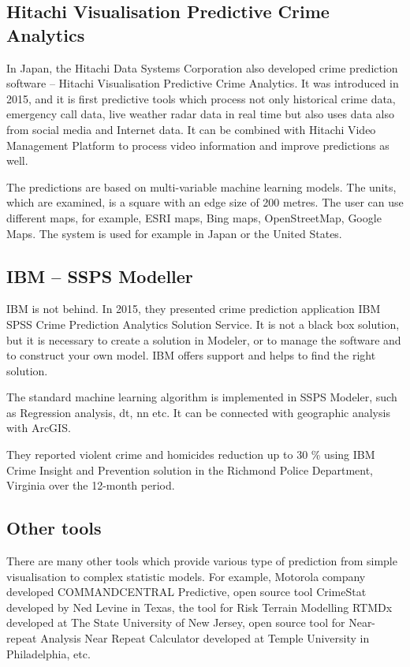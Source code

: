 \documentclass[thesis=M,english]{FITthesis}[2012/10/20]
\begin{document}
\subsection{Hitachi Visualisation Predictive Crime Analytics}

In Japan, the Hitachi Data Systems Corporation also developed crime prediction software -- Hitachi Visualisation Predictive Crime Analytics.\cite{hds} It was introduced in 2015, and it is first predictive tools which process not only historical crime data, emergency call data, live weather radar data in real time but also uses data also from social media and Internet data. It can be combined with Hitachi Video Management Platform to process video information and improve predictions as well.

The predictions are based on multi-variable machine learning models. The units, which are examined, is a square with an edge size of 200 metres. The user can use different maps, for example, ESRI maps, Bing maps, OpenStreetMap, Google Maps. The system is used for example in Japan or the United States. 

\subsection{IBM -- SSPS Modeller}

IBM is not behind. In 2015, they presented crime prediction application IBM SPSS Crime Prediction Analytics Solution Service.\cite{ibm} It is not a black box solution, but it is necessary to create a solution in Modeler, or to manage the software and to construct your own model. IBM offers support and helps to find the right solution.  

The standard machine learning algorithm is implemented in SSPS Mode\-ler, such as Regression analysis, \gls{dt}, \gls{nn} etc. It can be connected with geographic analysis with ArcGIS. 

They reported violent crime and homicides reduction up to 30 \% using IBM Crime Insight and Prevention solution in the Richmond Police Department, Virginia over the 12-month period.\cite[4]{ibm_percent} 

\subsection{Other tools}

There are many other tools which provide various type of prediction from simple visualisation to complex statistic models. For example, Motorola company developed COMMANDCENTRAL Predictive\cite{motorola}, open source tool Cri\-me\-Stat\cite{crimestat} developed by Ned Levine in Texas, the tool for Risk Terrain Modelling RTMDx\cite{rtmdx} developed at The State University of New Jersey, open source tool for Near-repeat Analysis Near Repeat Calculator\cite{nearrepeat} developed at Temple University in Philadelphia, etc. 
\end{document}
